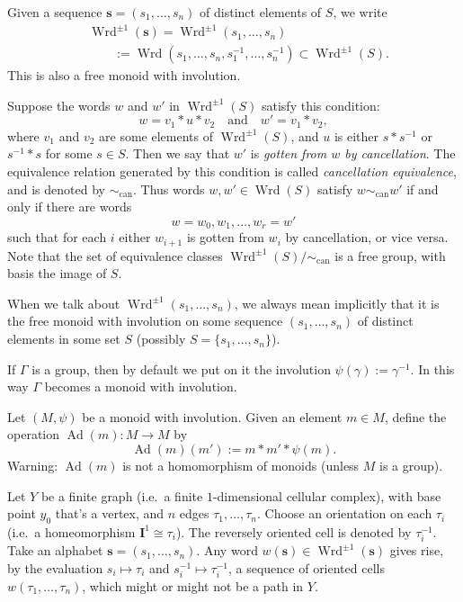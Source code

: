 \documentclass[10pt, a4paper]{amsart}
\theoremstyle{definition}
\numberwithin{equation}{section}
\newcommand{\opn}{\operatorname}
\newcommand{\mbf}[1]{\mathbf{#1}}
\newcommand{\mrm}[1]{\mathrm{#1}}
\newcommand{\bsym}[1]{\boldsymbol{#1}}
\begin{document}
Given a sequence $\bsym{s} = (s_1, \ldots, s_n)$ of distinct elements of $S$,
we write 
\[ \begin{aligned}
&\opn{Wrd}^{\pm 1}(\bsym{s}) = \opn{Wrd}^{\pm 1}(s_1, \ldots, s_n) \\
& \qquad := \opn{Wrd}(s_1, \ldots, s_n, s_1^{-1}, \ldots, s_n^{-1}) \subset 
\opn{Wrd}^{\pm 1}(S) .
\end{aligned} \]
This is also a free monoid with involution.

Suppose the words 
$w$ and $w'$ in $\opn{Wrd}^{\pm 1}(S)$ satisfy this condition: 
\[ w = v_1 * u * v_2 \quad \text{and} \quad w' = v_1  * v_2 , \]
where $v_1$ and $v_2$ are some elements of $\opn{Wrd}^{\pm 1}(S)$, and
$u$ is either $s * s^{-1}$ or $s^{-1} * s$ for some $s \in S$. 
Then we say that $w'$ is {\em gotten from $w$ by cancellation}.
The equivalence relation generated by this condition is called {\em cancellation
equivalence}, and is denoted by $\sim_{\mrm{can}}$. Thus words 
$w, w' \in \opn{Wrd}(S)$ satisfy $w \sim_{\mrm{can}} w'$ 
if and only if there are words
\[ w = w_0, w_1, \ldots, w_r = w' \]
such that for each $i$ either $w_{i+1}$ is gotten from $w_i$
by cancellation, or vice versa. Note that the set of equivalence classes
$\opn{Wrd}^{\pm 1}(S) / \sim_{\mrm{can}}$ is a free group, with basis the image
of $S$. 

When we talk about $\opn{Wrd}^{\pm 1}(s_1, \ldots, s_n)$, we always
mean implicitly that it is the free monoid with involution on some sequence
$(s_1, \ldots, s_n)$ of distinct elements in 
some set $S$ (possibly $S = \{ s_1, \ldots, s_n \}$). 

If $\Gamma$ is a group, then by default we put on it the involution
$\psi(\gamma) := \gamma^{-1}$. In this way $\Gamma$ becomes a monoid with
involution. 

Let $(M, \psi)$ be a monoid with involution. Given an element
$m \in M$, define the operation
$\opn{Ad}(m) : M \to M$ by
\begin{equation} \label{eqn:249}
\opn{Ad}(m)(m') := m * m' * \psi(m) .
\end{equation}
Warning: $\opn{Ad}(m)$ is not a homomorphism of monoids (unless $M$ is a
group). 

Let $Y$ be a finite graph (i.e.\ a finite $1$-dimensional cellular complex),
with base point $y_0$ that's a vertex, and $n$ edges $\tau_1, \ldots, \tau_n$.
Choose an orientation on each $\tau_i$ (i.e.\ a homeomorphism 
$\mbf{I}^{1} \cong \tau_i$). 
The reversely oriented cell is denoted by $\tau_i^{-1}$. 
Take an alphabet $\bsym{s} = (s_1, \ldots, s_n)$.
Any word $w(\bsym{s}) \in \opn{Wrd}^{\pm 1}(\bsym{s})$ gives rise, by the
evaluation
$s_i \mapsto \tau_i$ and $s_i^{-1} \mapsto \tau_i^{-1}$, a sequence of oriented
cells $w(\tau_1, \ldots, \tau_n)$, which might or might
not be a path in $Y$. 
\end{document}

